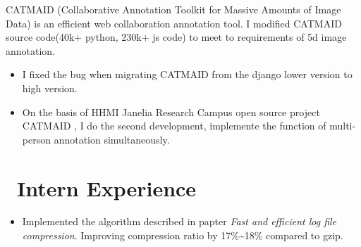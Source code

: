\documentclass{resume}
\begin{document}
CATMAID (Collaborative Annotation Toolkit for Massive Amounts of Image Data) is an efficient web collaboration annotation tool. I modified CATMAID source code(40k+ python, 230k+ js code) to meet to requirements of 5d image annotation.%
\begin{itemize}
  \item I fixed the bug when migrating CATMAID from the django lower version to high version.
  \item On the basis of HHMI Janelia Research Campus open source project CATMAID , I do the second development, implemente the function of multi-person annotation simultaneously.
\end{itemize}

\section{\faSitemap\ Intern Experience}

\begin{itemize}
    \item Implemented the algorithm described in papter \emph{Fast and efficient log file compression}. Improving compression ratio by 17\%\textasciitilde18\% compared to gzip.
\end{itemize}
\end{document}
